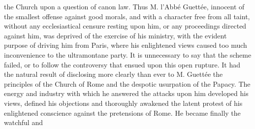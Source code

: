 the Church upon a question of canon law. Thus M. l'Abbé Guettée, innocent of the smallest offense against good morals, and with a character free from all taint, without any ecclesiastical censure resting upon him, or any proceedings directed against him, was deprived of the exercise of his ministry, with the evident purpose of driving him from Paris, where his enlightened views caused too much inconvenience to the ultramontane party. It is unnecessary to say that the scheme failed, or to follow the controversy that ensued upon this open rupture. It had the natural result of disclosing more clearly than ever to M. Guettée the principles of the Church of Rome and the despotic usurpation of the Papacy. The energy and industry with which he answered the attacks upon him developed his views, defined his objections and thoroughly awakened the latent protest of his enlightened conscience against the pretensions of Rome. He became finally the watchful and

